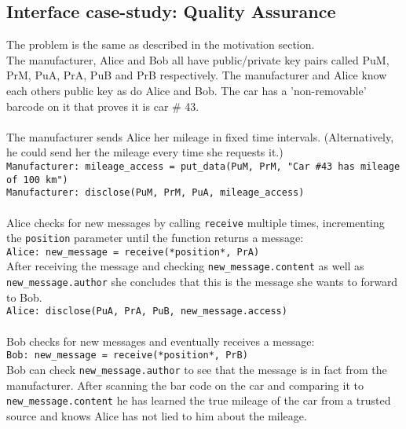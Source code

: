 \documentclass[a4paper]{article} %
\begin{document}
\subsection{Interface case-study: Quality Assurance}
The problem is the same as described in the motivation section.\\
The manufacturer, Alice and Bob all have public/private key pairs called PuM, PrM, PuA, PrA, PuB and PrB respectively. The manufacturer and Alice know each others public key as do Alice and Bob. The car has a 'non-removable' barcode on it that proves it is car \# 43. \\
\\
The manufacturer sends Alice her mileage in fixed time intervals. (Alternatively, he could send her the mileage every time she requests it.)\\
\lstinline{Manufacturer: mileage_access = put_data(PuM, PrM, "Car #43 has mileage of 100 km")}\\
\lstinline{Manufacturer: disclose(PuM, PrM, PuA, mileage_access)}\\
\\Alice checks for new messages by calling \lstinline{receive} multiple times, incrementing the \lstinline{position} parameter until the function returns a message:\\
\lstinline{Alice: new_message = receive(*position*, PrA)}\\
After receiving the message and checking \lstinline{new_message.content} as well as \lstinline{new_message.author} she concludes that this is the message she wants to forward to Bob.\\
\lstinline{Alice: disclose(PuA, PrA, PuB, new_message.access)}\\
\\Bob checks for new messages and eventually receives a message:\\
\lstinline{Bob: new_message = receive(*position*, PrB)}\\
Bob can check \lstinline{new_message.author} to see that the message is in fact from the manufacturer. After scanning the bar code on the car and comparing it to \lstinline{new_message.content} he has learned the true mileage of the car from a trusted source and knows Alice has not lied to him about the mileage.
\end{document}
